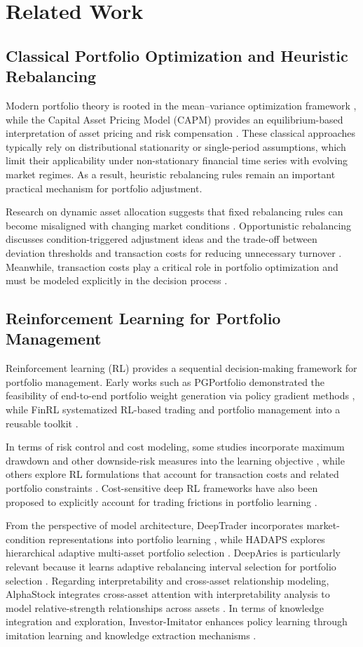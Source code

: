 \documentclass[letterpaper]{article} %
\begin{document}
\section{Related Work}
\subsection{Classical Portfolio Optimization and Heuristic Rebalancing}
Modern portfolio theory is rooted in the mean--variance optimization framework \citep{MVO}, while the Capital Asset Pricing Model (CAPM) provides an equilibrium-based interpretation of asset pricing and risk compensation \citep{CAMP}. These classical approaches typically rely on distributional stationarity or single-period assumptions, which limit their applicability under non-stationary financial time series with evolving market regimes. As a result, heuristic rebalancing rules remain an important practical mechanism for portfolio adjustment.

Research on dynamic asset allocation suggests that fixed rebalancing rules can become misaligned with changing market conditions \citep{Perold1988DynamicSF}. Opportunistic rebalancing discusses condition-triggered adjustment ideas and the trade-off between deviation thresholds and transaction costs for reducing unnecessary turnover \citep{9}. Meanwhile, transaction costs play a critical role in portfolio optimization and must be modeled explicitly in the decision process \citep{10}.

\subsection{Reinforcement Learning for Portfolio Management}
Reinforcement learning (RL) provides a sequential decision-making framework for portfolio management. Early works such as PGPortfolio demonstrated the feasibility of end-to-end portfolio weight generation via policy gradient methods \citep{4}, while FinRL systematized RL-based trading and portfolio management into a reusable toolkit \citep{5}.

In terms of risk control and cost modeling, some studies incorporate maximum drawdown and other downside-risk measures into the learning objective \citep{11}, while others explore RL formulations that account for transaction costs and related portfolio constraints \citep{23}. Cost-sensitive deep RL frameworks have also been proposed to explicitly account for trading frictions in portfolio learning \citep{24}.

From the perspective of model architecture, DeepTrader incorporates market-condition representations into portfolio learning \citep{6}, while HADAPS explores hierarchical adaptive multi-asset portfolio selection \citep{25}. DeepAries is particularly relevant because it learns adaptive rebalancing interval selection for portfolio selection \citep{deeparies2025}. Regarding interpretability and cross-asset relationship modeling, AlphaStock integrates cross-asset attention with interpretability analysis to model relative-strength relationships across assets \citep{alphastock}. In terms of knowledge integration and exploration, Investor-Imitator enhances policy learning through imitation learning and knowledge extraction mechanisms \citep{8}.
\end{document}

